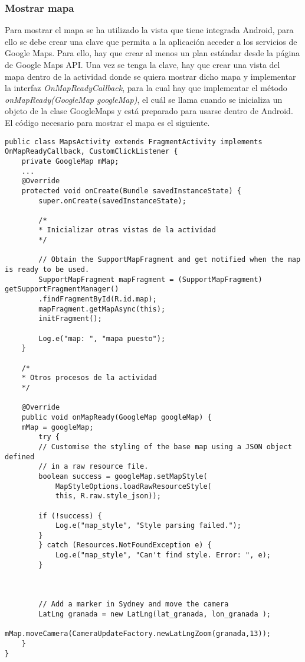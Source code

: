 \subsubsection{Mostrar mapa}
Para mostrar el mapa se ha utilizado la vista que tiene integrada Android, para ello se debe crear una clave que  permita a la aplicación acceder a los servicios de Google Maps. Para ello, hay que crear al menos un plan estándar desde la página de Google Maps API. Una vez se tenga la clave, hay que crear una vista del mapa dentro de la actividad donde se quiera mostrar dicho mapa y implementar la interfaz \textit{OnMapReadyCallback}, para la cual hay que implementar el método \textit{onMapReady(GoogleMap googleMap)}, el cuál se llama cuando se inicializa un objeto de la clase GoogleMaps y está preparado para usarse dentro de Android. El código necesario para mostrar el mapa es el siguiente.
\newpage
\begin{lstlisting}[caption=código necesario para mostrar el mapa en la aplicación.]
public class MapsActivity extends FragmentActivity implements OnMapReadyCallback, CustomClickListener {
	private GoogleMap mMap;
	...
	@Override
	protected void onCreate(Bundle savedInstanceState) {
		super.onCreate(savedInstanceState);
		
		/*
		* Inicializar otras vistas de la actividad
		*/
		
		// Obtain the SupportMapFragment and get notified when the map is ready to be used.
		SupportMapFragment mapFragment = (SupportMapFragment) getSupportFragmentManager()
		.findFragmentById(R.id.map);
		mapFragment.getMapAsync(this);
		initFragment();
		
		Log.e("map: ", "mapa puesto");
	}
	
	/*
	* Otros procesos de la actividad
	*/
	
	@Override
	public void onMapReady(GoogleMap googleMap) {
	mMap = googleMap;
		try {
		// Customise the styling of the base map using a JSON object defined
		// in a raw resource file.
		boolean success = googleMap.setMapStyle(
			MapStyleOptions.loadRawResourceStyle(
			this, R.raw.style_json));
		
		if (!success) {
			Log.e("map_style", "Style parsing failed.");
		}
		} catch (Resources.NotFoundException e) {
			Log.e("map_style", "Can't find style. Error: ", e);
		}
		
		
		
		// Add a marker in Sydney and move the camera
		LatLng granada = new LatLng(lat_granada, lon_granada );
		mMap.moveCamera(CameraUpdateFactory.newLatLngZoom(granada,13));
	}
}
\end{lstlisting}

